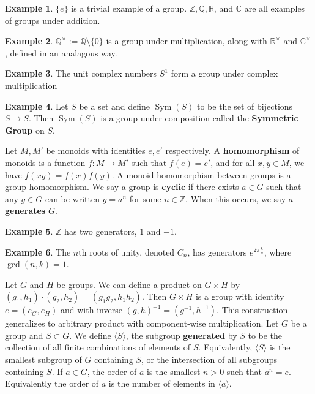 \documentclass[12pt, reqno]{article}
\theoremstyle{plain}
\theoremstyle{definition}
\newtheorem*{example}{Example}
\begin{document}
\begin{example}
    $\{e\}$ is a trivial example of a group. $\mathbb{Z}, \mathbb{Q}, \mathbb{R}$, and $\mathbb{C}$ are all
    examples of groups under addition.
\end{example}

\begin{example}
    $\mathbb{Q}^\times := \mathbb{Q} \setminus \{0\}$ is a group under multiplication, along with $\mathbb{R}^\times$ 
    and $\mathbb{C}^\times$, defined in an analagous way.
\end{example}

\begin{example}
    The unit complex numbers $S^1$ form a group under complex multiplication
\end{example}

\begin{example}
    Let $S$ be a set and define $\operatorname{Sym}(S)$ to be the set of bijections $S \rightarrow S$. Then $\operatorname{Sym}(S)$
    is a group under composition called the \textbf{Symmetric Group} on $S$.
\end{example}

Let $M, M'$ be monoids with identities $e, e'$ respectively. A \textbf{homomorphism} of monoids is a function 
$f: M \rightarrow M'$ such that $f(e) = e'$, and for all $x,y \in M$, we have $f(xy) = f(x)f(y)$. A monoid homomorphism
between groups is a group homomorphism.
\bigbreak
We say a group is \textbf{cyclic} if there exists $a \in G$ such that any $g \in G$ can be written $g = a^n$ for 
some $n \in \mathbb{Z}$. When this occurs, we say $a$ \textbf{generates} $G$. 

\begin{example}
    $\mathbb{Z}$ has two generators, $1$ and $-1$.
\end{example}

\begin{example}
    The $n$th roots of unity, denoted $C_n$, has generators $e^{2\pi\frac{k}{n}}$, where $\gcd(n,k) = 1$.
\end{example}

Let $G$ and $H$ be groups. We can define a product on $G\times H$ by $(g_1, h_1)\cdot(g_2,h_2) = (g_1 g_2, h_1 h_2)$.
Then $G\times H$ is a group with identity $e = (e_G,e_H)$ and with inverse $(g,h)^{-1} = (g^{-1}, h^{-1})$. This 
construction generalizes to arbitrary product with component-wise multiplication.
\bigbreak
Let $G$ be a group and $S \subset G$. We define $\langle S\rangle$, the subgroup \textbf{generated} by $S$ to
be the collection of all finite combinations of elements of $S$. Equivalently, $\langle S \rangle$ is the smallest
subgroup of $G$ containing $S$, or the intersection of all subgroups containing $S$. If $a \in G$, the order of $a$
is the smallest $n > 0$ such that $a^n = e$. Equivalently the order of $a$ is the number of elements in $\langle a \rangle$. 
\end{document}
